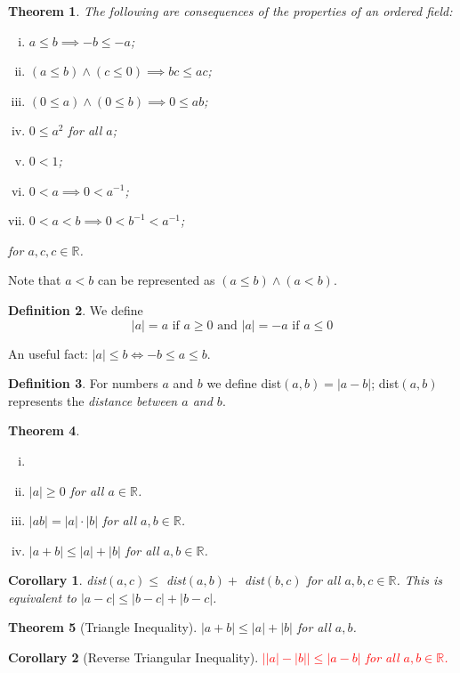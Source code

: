 \documentclass[12pt, lettersize]{book}
\theoremstyle{plain}
\newtheorem{thm}{Theorem}[section]
\newtheorem{cor}{Corollary}[thm]
\theoremstyle{definition}
\newtheorem{dfn}[thm]{Definition}
\theoremstyle{remark}
\newcommand{\R}{\mathbb{R}}
\begin{document}
	\begin{thm}\label{thm:3.2}
		The following are consequences of the properties of an ordered field:
		\begin{enumerate}[(i)]
			\item $a\leq b\implies-b\leq-a$;
			\item $(a\leq b)\land(c\leq0)\implies bc\leq ac$;
			\item $(0\leq a)\land(0\leq b)\implies 0\leq ab$;
			\item $0\leq a^2$ for all $a$;
			\item $0<1$;
			\item $0<a\implies0< a^{-1}$;
			\item $0<a<b\implies0<b^{-1}<a^{-1}$;
		\end{enumerate}
		for $a,c,c\in\R$.
	\end{thm}
	Note that $a<b$ can be represented as $(a\leq b)\land(a<b)$.
	
	\begin{dfn}\label{def:3.3}
		We define
		\begin{displaymath}
			\text{$|a|=a$ if $a\geq0$  and   $|a|=-a$ if $a\leq0$}
		\end{displaymath}
	\end{dfn}
	
	An useful fact: $|a|\leq b\iff -b\leq a\leq b$.
	
	\begin{dfn}\label{def:3.4}
		For numbers $a$ and $b$ we define dist$(a,b)=|a-b|$; dist$(a,b)$ represents the \emph{distance between $a$ and $b$}.
	\end{dfn}
	
	\begin{thm}\label{thm:3.5}
		\begin{enumerate}[(i)]
			\item[]
			\item $|a|\geq0$ for all $a\in\R$.
			\item $|ab|=|a|\cdot|b|$ for all $a,b\in\R$.
			\item $|a+b|\leq|a|+|b|$ for all $a,b\in\R$. 
		\end{enumerate}
	\end{thm}
	
	\begin{cor}\label{cor:3.6}
		dist$(a,c)\leq$ dist$(a,b)+$ dist$(b,c)$ for all $a,b,c\in\R$. This is equivalent to $|a-c|\leq|b-c|+|b-c|$.
	\end{cor}
	
	\begin{thm}[Triangle Inequality]\label{thm:3.7}
		$|a+b|\leq|a|+|b|$ for all $a,b$.
	\end{thm}
	\begin{cor}[Reverse Triangular Inequality]\label{cor: reverse triangular}
		\textcolor{red}{$\big||a|-|b|\big|\leq|a-b|$ for all $a,b\in\R$.}	
	\end{cor}
	
\end{document}
